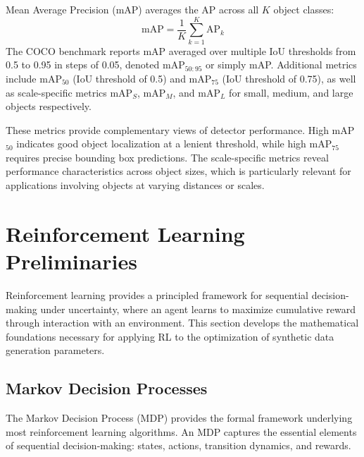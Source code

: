 \begin{definition}
\label{def:map}
Mean Average Precision (mAP) averages the AP across all $K$ object classes:
\begin{equation}
\text{mAP} = \frac{1}{K} \sum_{k=1}^{K} \text{AP}_k
\end{equation}
The COCO benchmark reports mAP averaged over multiple IoU thresholds from 0.5 to 0.95 in steps of 0.05, denoted mAP$_{50:95}$ or simply mAP. Additional metrics include mAP$_{50}$ (IoU threshold of 0.5) and mAP$_{75}$ (IoU threshold of 0.75), as well as scale-specific metrics mAP$_S$, mAP$_M$, and mAP$_L$ for small, medium, and large objects respectively.
\end{definition}

These metrics provide complementary views of detector performance. High mAP$_{50}$ indicates good object localization at a lenient threshold, while high mAP$_{75}$ requires precise bounding box predictions. The scale-specific metrics reveal performance characteristics across object sizes, which is particularly relevant for applications involving objects at varying distances or scales.

\section{Reinforcement Learning Preliminaries}
\label{sec:rl_preliminaries}

Reinforcement learning provides a principled framework for sequential decision-making under uncertainty, where an agent learns to maximize cumulative reward through interaction with an environment. This section develops the mathematical foundations necessary for applying RL to the optimization of synthetic data generation parameters.

\subsection{Markov Decision Processes}
\label{subsec:mdp}

The Markov Decision Process (MDP) provides the formal framework underlying most reinforcement learning algorithms. An MDP captures the essential elements of sequential decision-making: states, actions, transition dynamics, and rewards.

